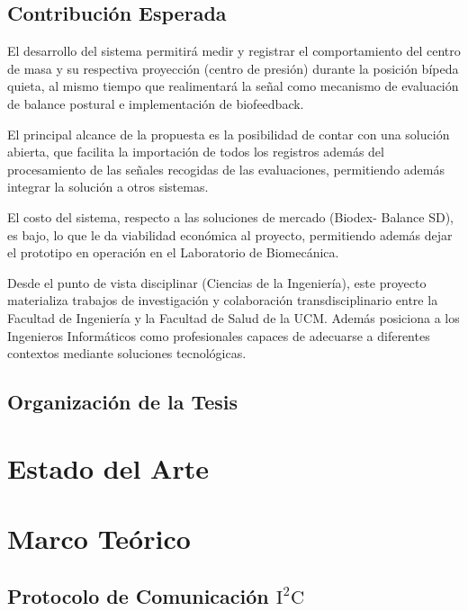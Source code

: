 \documentclass[12pt,a4paper]{article}
\let\stdsection\section
\renewcommand\section{\newpage\stdsection}
\begin{document}
\subsection{Contribución Esperada}

El desarrollo del sistema permitirá medir y registrar el comportamiento del centro de masa y su respectiva proyección (centro de presión) durante la posición bípeda quieta, al mismo tiempo que realimentará la señal como mecanismo de evaluación de balance postural e implementación de biofeedback.

El principal alcance de la propuesta es la posibilidad de contar con una solución abierta, que facilita la importación de todos los registros además del procesamiento de las señales recogidas de las evaluaciones, permitiendo además integrar la solución a otros sistemas.
 
El costo del sistema, respecto a las soluciones de mercado (Biodex- Balance SD), es bajo, lo que le da viabilidad económica al proyecto, permitiendo además dejar el prototipo en operación en el Laboratorio de Biomecánica. 

Desde el punto de vista disciplinar (Ciencias de la Ingeniería), este proyecto materializa trabajos de investigación y colaboración transdisciplinario entre la Facultad de Ingeniería y la Facultad de Salud de la UCM. Además posiciona a los Ingenieros Informáticos como profesionales capaces de adecuarse a diferentes contextos mediante soluciones tecnológicas.
\subsection{Organizaci\'on de la Tesis}



\section{Estado del Arte}




\section{Marco Te\'orico}

\subsection{Protocolo de Comunicación $\mathbf{\mathrm{I^2C}}$}
\end{document}
